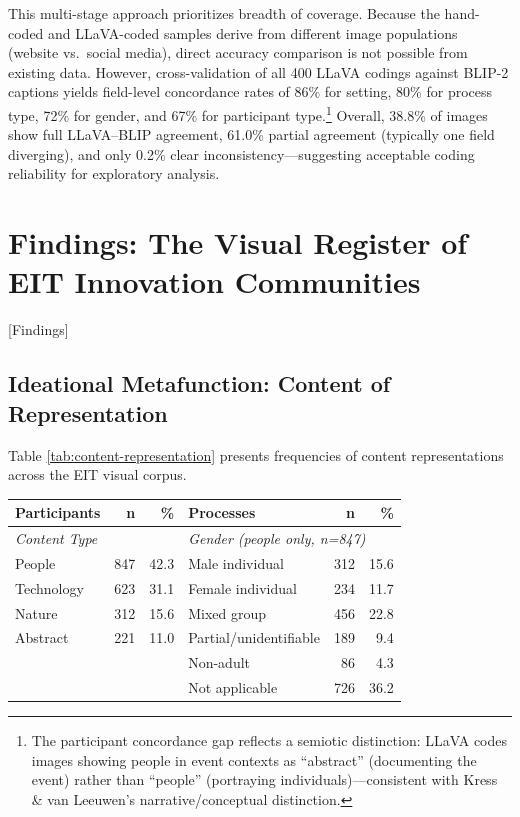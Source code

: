 \documentclass[../main.tex]{subfiles}
\begin{document}
This multi-stage approach prioritizes breadth of coverage. Because the hand-coded and LLaVA-coded samples derive from different image populations (website vs.\ social media), direct accuracy comparison is not possible from existing data. However, cross-validation of all 400 LLaVA codings against BLIP-2 captions yields field-level concordance rates of 86\% for setting, 80\% for process type, 72\% for gender, and 67\% for participant type.\footnote{The participant concordance gap reflects a semiotic distinction: LLaVA codes images showing people in event contexts as ``abstract'' (documenting the event) rather than ``people'' (portraying individuals)---consistent with Kress \& van Leeuwen's narrative/conceptual distinction.} Overall, 38.8\% of images show full LLaVA--BLIP agreement, 61.0\% partial agreement (typically one field diverging), and only 0.2\% clear inconsistency---suggesting acceptable coding reliability for exploratory analysis.

\section{Findings: The Visual Register of EIT Innovation Communities}[Findings]

\subsection{Ideational Metafunction: Content of Representation}

Table \ref{tab:content-representation} presents frequencies of content representations across the EIT visual corpus.

\begin{center}
\small
\begin{tabular}{lrrlrr}
\toprule
\textbf{Participants} & \textbf{n} & \textbf{\%} & \textbf{Processes} & \textbf{n} & \textbf{\%} \\
\midrule
\multicolumn{3}{l}{\textit{Content Type}} & \multicolumn{3}{l}{\textit{Gender (people only, n=847)}} \\
People & 847 & 42.3 & \quad Male individual & 312 & 15.6 \\
Technology & 623 & 31.1 & \quad Female individual & 234 & 11.7 \\
Nature & 312 & 15.6 & \quad Mixed group & 456 & 22.8 \\
Abstract & 221 & 11.0 & \quad Partial/unidentifiable & 189 & 9.4 \\
 & & & \quad Non-adult & 86 & 4.3 \\
 & & & \quad Not applicable & 726 & 36.2 \\
\bottomrule
\end{tabular}
\end{center}
\end{document}
